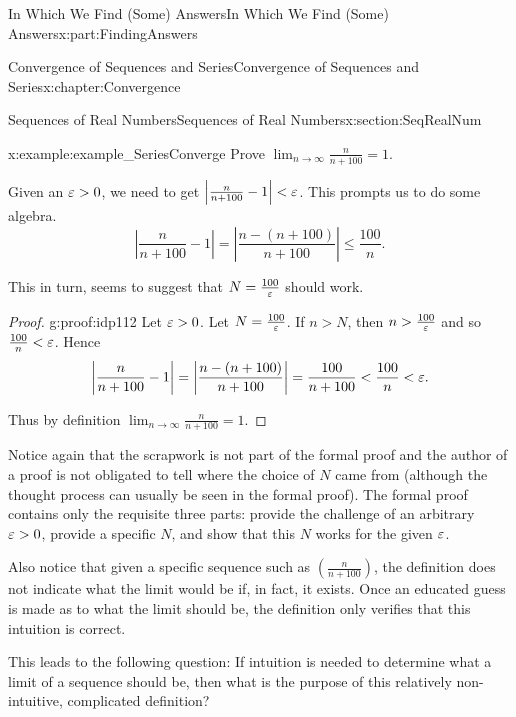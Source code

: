 \begin{partptx}{In Which We Find (Some) Answers}{}{In Which We Find (Some) Answers}{}{}{x:part:FindingAnswers}
\begin{chapterptx}{Convergence of Sequences and Series}{}{Convergence of Sequences and Series}{}{}{x:chapter:Convergence}
\begin{sectionptx}{Sequences of Real Numbers}{}{Sequences of Real Numbers}{}{}{x:section:SeqRealNum}
\begin{example}{}{x:example:example_SeriesConverge}
				Prove \(\displaystyle\lim_{n\rightarrow\infty}\frac{n}{n+100}=1\).%
				\par
				\par
				Given an \(\varepsilon>0\), we need to get \(\left|\frac{n}{n+100}-1\right|< \varepsilon\). This prompts us to do some algebra.%
				\begin{equation*}
					\left|\frac{n}{n+100}-1\right|=\left|\frac{n-(n+100)}{n+100}\right|\leq\frac{100}{n}\text{.}
				\end{equation*}
				\par
				This in turn, seems to suggest that \(N=\frac{100}{\varepsilon}\) should work.%
			\end{example}
			\begin{proof}{}{g:proof:idp112}
				Let \(\varepsilon>0\). Let \(N=\frac{100}{\varepsilon}\). If \(n>N\), then \(n>\frac{100}{\varepsilon}\) and so \(\frac{100}{n}< \varepsilon\). Hence%
				\begin{equation*}
					\left|\frac{n}{n+100}-1\right|=\left|\frac{n-(n+100)}{n+100}\right|= \frac{100}{n+100}< \frac{100}{n}< \varepsilon\text{.}
				\end{equation*}
				\par
				Thus by definition \(\lim_{n\rightarrow\infty}\frac{n}{n+100} =1\).%
			\end{proof}
			Notice again that the scrapwork is not part of the formal proof and the author of a proof is not obligated to tell where the choice of \(N\) came from (although the thought process can usually be seen in the formal proof). The formal proof contains only the requisite three parts: provide the challenge of an arbitrary \(\varepsilon>0\), provide a specific \(N\), and show that this \(N\) works for the given \(\varepsilon\).%
			\par
			Also notice that given a specific sequence such as \(\left(\frac{n}{n+100}\right)\), the definition does not indicate what the limit would be if, in fact, it exists. Once an educated guess is made as to what the limit should be, the definition only verifies that this intuition is correct.%
			\par
			This leads to the following question: If intuition is needed to determine what a limit of a sequence should be, then what is the purpose of this relatively non-intuitive, complicated definition?%
			\par

\end{sectionptx}
\end{chapterptx}
\end{partptx}
